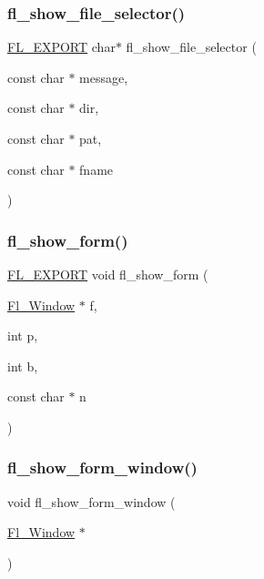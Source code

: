 \subsubsection{\texorpdfstring{fl\+\_\+show\+\_\+file\+\_\+selector()}{fl\_show\_file\_selector()}}
{\footnotesize\ttfamily \hyperlink{_fl___export_8_h_aa9ba29a18aee9d738370a06eeb4470fc}{F\+L\+\_\+\+E\+X\+P\+O\+RT} char$\ast$ fl\+\_\+show\+\_\+file\+\_\+selector (\begin{DoxyParamCaption}\item[{const char $\ast$}]{message,  }\item[{const char $\ast$}]{dir,  }\item[{const char $\ast$}]{pat,  }\item[{const char $\ast$}]{fname }\end{DoxyParamCaption})}

\mbox{\label{forms_8_h_a35d34745363601aaf84379175e7b3702}} 
\subsubsection{\texorpdfstring{fl\+\_\+show\+\_\+form()}{fl\_show\_form()}}
{\footnotesize\ttfamily \hyperlink{_fl___export_8_h_aa9ba29a18aee9d738370a06eeb4470fc}{F\+L\+\_\+\+E\+X\+P\+O\+RT} void fl\+\_\+show\+\_\+form (\begin{DoxyParamCaption}\item[{\hyperlink{class_fl___window}{Fl\+\_\+\+Window} $\ast$}]{f,  }\item[{int}]{p,  }\item[{int}]{b,  }\item[{const char $\ast$}]{n }\end{DoxyParamCaption})}

\mbox{\label{forms_8_h_a450b0f8c922b358f41f8bdee7c76cf3a}} 
\subsubsection{\texorpdfstring{fl\+\_\+show\+\_\+form\+\_\+window()}{fl\_show\_form\_window()}}
{\footnotesize\ttfamily void fl\+\_\+show\+\_\+form\+\_\+window (\begin{DoxyParamCaption}\item[{\hyperlink{class_fl___window}{Fl\+\_\+\+Window} $\ast$}]{ }\end{DoxyParamCaption})\hspace{0.3cm}{\ttfamily [inline]}}

